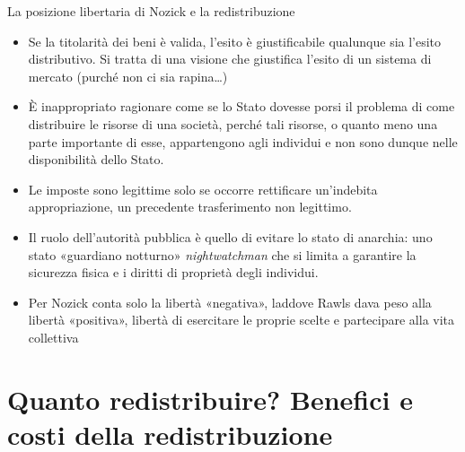 \documentclass[aspectratio=64,11pt]{beamer}
\begin{document}
\begin{frame}{La posizione libertaria di Nozick e la redistribuzione}
\begin{itemize}
\item Se la titolarità dei beni è valida, l'esito è giustificabile qualunque sia
l'esito distributivo. Si tratta di una visione che giustifica l'esito di un
sistema di mercato (purché non ci sia rapina\ldots{})
\item È inappropriato ragionare come se lo Stato dovesse porsi il problema di come
distribuire le risorse di una società, perché tali risorse, o quanto meno
una parte importante di esse, appartengono agli individui e non sono dunque
nelle disponibilità dello Stato.
\item Le imposte sono legittime solo se occorre rettificare un'indebita
appropriazione, un precedente trasferimento non legittimo.
\item Il ruolo dell'autorità pubblica è quello di evitare lo stato di anarchia:
uno stato «guardiano notturno» \emph{nightwatchman} che si limita a garantire la
sicurezza fisica e i diritti di proprietà degli individui.
\item Per Nozick conta solo la libertà «negativa», laddove Rawls dava peso alla
libertà «positiva», libertà di esercitare le proprie scelte e partecipare
alla vita collettiva
\end{itemize}
\end{frame}

\section{Quanto redistribuire? Benefici e costi della redistribuzione}
\end{document}
